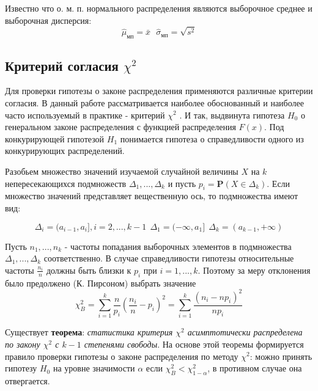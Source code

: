 \documentclass[12pt,a4paper]{article}
\begin{document}
Известно \cite[стр. 444]{verrazdely} что о. м. п. нормального распределения являются выборочное среднее и выборочная дисперсия:
\begin{equation}
	\widehat{\mu}_{\text{мп}} = \bar{x} \ \ \ \widehat{\sigma}_{\text{мп}} = \sqrt{s^2}
\end{equation}

\subsection{Критерий согласия $\chi^2$}
Для проверки гипотезы о законе распределения применяются различные критерии согласия. В данный работе рассматривается наиболее обоснованный и наиболее часто используемый в практике - критерий $\chi^2$ \cite[стр. 482]{verrazdely}. И так, выдвинута гипотеза $H_0$ о генеральном законе распределения с функцией распределения $F(x)$. Под конкурирующей гипотезой $H_1$ понимается гипотеза о справедливости одного из конкурирующих распределений.

Разобьем множество значений изучаемой случайной величины $X$ на $k$ непересекающихся подмножеств $\Delta_1, ..., \Delta_k$ и пусть $p_i = \textbf{P}(X \in \Delta_k)$. Если множество значений представляет вещественную ось, то подмножества имеют вид:

\begin{equation} 
	\Delta_i = (a_{i-1}, a_i], i = 2, ...,k-1 \ \ \Delta_1 = (-\infty, a_1] \ \ \Delta_k = (a_{k-1}, +\infty)
\end{equation}

Пусть $n_1, ..., n_k$ - частоты попадания выборочных элементов в подмножества $\Delta_1, ..., \Delta_k$ соответственно. В случае справедливости гипотезы относительные частоты $\frac{n_i}{n}$ должны быть близки к $p_i$ при $i = 1, ..., k$. Поэтому за меру отклонения было предолжено (К. Пирсоном) \cite[стр. 483]{verrazdely} выбрать значение 
\begin{equation}
	\chi^2_{B} = \sum_{i=1}^{k} \frac{n}{p_{i}}\left(\frac{n_{i}}{n}-p_{i}\right)^{2}=\sum_{i=1}^{k} \frac{\left(n_{i} - n p_{i}\right)^{2}}{n p_{i}}
\end{equation}

Существует \textbf{теорема}: \textit{статистика критерия $\chi^2$ асимптотически распределена по закону $\chi^2$ с $k-1$ степенями свободы}. На основе этой теоремы формируется правило проверки гипотезы о законе распределения по методу $\chi^2$: можно принять гипотезу $H_0$ на уровне значимости $\alpha$ если $\chi^2_{B} < \chi^2_{1-\alpha}$, в противном случае она отвергается.
\end{document}
